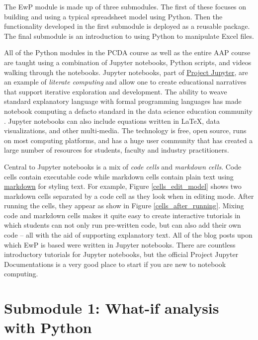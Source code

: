 \documentclass[ited,blindrev]{informs3}              %
\begin{document}
The EwP module is made up of three submodules. The first of these focuses on building and using a typical spreadsheet model using Python. Then the functionality developed in the first submodule is deployed as a reusable package. The final submodule is an introduction to using Python to manipulate Excel files.

All of the Python modules in the PCDA course as well as the entire AAP course are taught using a combination of Jupyter notebooks, Python scripts, and videos walking through the notebooks. Jupyter notebooks, part of \href{https://jupyter.org/}{Project Jupyter}, are an example of \textit{literate computing} \cite{Jupyter_proposal} and allow one to create educational narratives that support iterative exploration and development. The ability to weave standard explanatory language with formal programming languages has made notebook computing a defacto standard in the data science education community \cite{perkel2018jupyter}. Jupyter notebooks can also include equations written in \LaTeX, data visualizations, and other multi-media. The technology is free, open source, runs on most computing platforms, and has a huge user community that has created a large number of resources for students, faculty and industry practitioners. 

Central to Jupyter notebooks is a mix of \textit{code cells} and \textit{markdown cells}. Code cells contain executable code while markdown cells contain plain text using \href{URL}{markdown} for styling text. For example, Figure \ref{cells_edit_model} shows two markdown cells separated by a code cell as they look when in editing mode. After running the cells, they appear as show in Figure \ref{cells_after_running}. Mixing code and markdown cells makes it quite easy to create interactive tutorials in which students can not only run pre-written code, but can also add their own code -- all with the aid of supporting explanatory text. All of the blog posts upon which EwP is based were written in Jupyter notebooks. There are countless introductory tutorials for Jupyter notebooks, but the official Project Jupyter Documentations \cite{ProjectJupyterDocumentation} is a very good place to start if you are new to notebook computing.


\section{Submodule 1: What-if analysis with Python}
\end{document}
